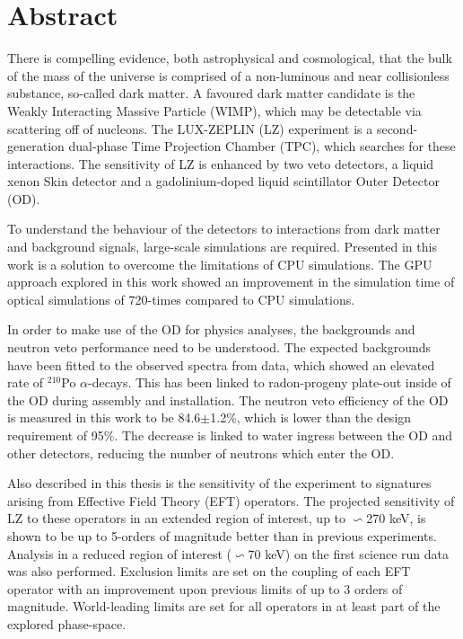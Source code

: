 %
%
%

\chapter*{Abstract}
\begin{SingleSpace}
\par
There is compelling evidence, both astrophysical and cosmological, that the bulk of the mass of the universe is comprised of a non-luminous and near collisionless substance, so-called dark matter.
A favoured dark matter candidate is the Weakly Interacting Massive Particle (WIMP), which may be detectable via scattering off of nucleons.
The LUX-ZEPLIN (LZ) experiment is a second-generation dual-phase Time Projection Chamber (TPC), which searches for these interactions.
The sensitivity of LZ is enhanced by two veto detectors, a liquid xenon Skin detector and a gadolinium-doped liquid scintillator Outer Detector (OD).
\par
To understand the behaviour of the detectors to interactions from dark matter and background signals, large-scale simulations are required.
Presented in this work is a solution to overcome the limitations of CPU simulations.
The GPU approach explored in this work showed an improvement in the simulation time of optical simulations of 720-times compared to CPU simulations.
\par
In order to make use of the OD for physics analyses, the backgrounds and neutron veto performance need to be understood.
The expected backgrounds have been fitted to the observed spectra from data, which showed an elevated rate of ${}^{210}$Po $\alpha$-decays.
This has been linked to radon-progeny plate-out inside of the OD during assembly and installation.
The neutron veto efficiency of the OD is measured in this work to be 84.6$\pm$1.2\%, which is lower than the design requirement of 95\%.
The decrease is linked to water ingress between the OD and other detectors, reducing the number of neutrons which enter the OD.
\par
Also described in this thesis is the sensitivity of the experiment to signatures arising from Effective Field Theory (EFT) operators.
The projected sensitivity of LZ to these operators in an extended region of interest, up to $\backsim$270 keV, is shown to be up to 5-orders of magnitude better than in previous experiments.
Analysis in a reduced region of interest ($\backsim$70 keV) on the first science run data was also performed.
Exclusion limits are set on the coupling of each EFT operator with an improvement upon previous limits of up to 3 orders of magnitude.
World-leading limits are set for all operators in at least part of the explored phase-space. 

\end{SingleSpace}
\clearpage